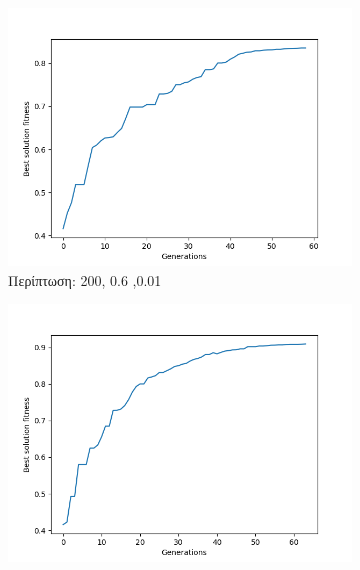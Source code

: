 \documentclass[12pt,a4paper]{article}
\begin{document}
\begin{enumerate}
\begin{figure}[H]
\begin{subfigure}[H]{0.7\textwidth}
                     \end{subfigure}
                 \end{figure}
                 \begin{figure}[H]
                     \centering
                     \begin{subfigure}[h]{0.7\textwidth}
                         \centering
                         \includegraphics[width=\textwidth]{images/7.png}
                         \caption*{Περίπτωση: 200, 0.6 ,0.01}
                     \end{subfigure}
                     \begin{subfigure}[h]{0.7\textwidth}
                         \centering
                         \includegraphics[width=\textwidth]{images/8.png}

\end{subfigure}
\end{figure}
\end{enumerate}
\end{document}

